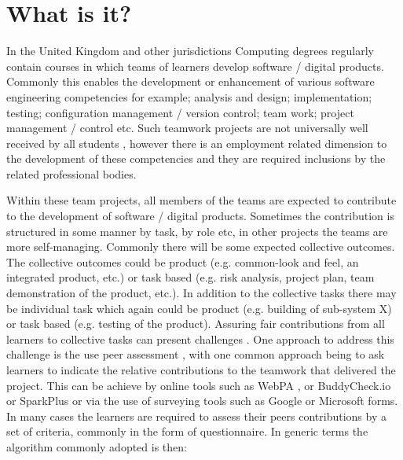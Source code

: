 \documentclass[sigconf, anonymous=true]{acmart}
\begin{document}



\maketitle

\section{What is it?}	
\label{sec:What}
In the United Kingdom and other jurisdictions Computing degrees regularly contain courses in which teams of learners develop software / digital products. Commonly this enables the development or enhancement of various software engineering competencies for example; analysis and design; implementation; testing; configuration management / version control; team work; project management / control etc. Such teamwork projects are not universally well received by all students \cite{Gordon2010}, however there is an employment related dimension \cite{Thomas2003} to the development of these competencies and they are required inclusions by the related professional bodies\cite{Crick2020}. 

Within these team projects, all members of the teams are expected to contribute to the  development of software / digital products. Sometimes the contribution is structured in some manner by task, by role etc, in other projects the teams are more self-managing. Commonly there will be some expected collective outcomes. The collective outcomes could be product (e.g. common-look and feel, an integrated product, etc.) or task based (e.g. risk analysis, project plan, team demonstration of the product, etc.).  In addition to the collective tasks there may be individual task which again could be product (e.g. building of sub-system X) or task based (e.g. testing of the product). Assuring fair contributions from all learners to collective tasks can present challenges \cite{Philips21}. One approach to address this challenge is the use peer assessment \cite{Gordon2010}, with one common approach being to ask learners to indicate the relative contributions to the teamwork that delivered the project. This can be achieve by online tools such as WebPA \cite{WebPA}, or BuddyCheck.io \cite{BuddyCheck} or SparkPlus \cite{SparkPlus} or via the use of surveying tools such as Google or Microsoft forms. In many cases the learners are required to assess their peers contributions by a set of criteria, commonly in the form of questionnaire.  In generic terms the algorithm commonly adopted is then:
\end{document}
